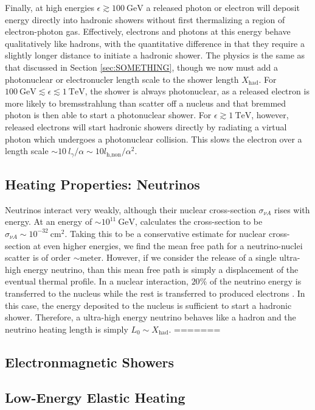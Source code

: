 \documentclass[twocolumn, preprintnumbers,amsmath,amssymb,prd, superscriptaddress]{revtex4}
\newcommand{\TeV}{\text{TeV}}
\newcommand{\GeV}{\text{GeV}}
\newcommand{\cm}{\text{cm}}
\begin{document}
Finally, at high energies $\epsilon \gtrsim 100~\GeV$ a released photon or electron will deposit energy directly into hadronic showers without first thermalizing a region of electron-photon gas.
Effectively, electrons and photons at this energy behave qualitatively like hadrons, with the quantitative difference in that they require a slightly longer distance to initiate a hadronic shower.
The physics is the same as that discussed in Section \ref{sec:SOMETHING}, though we now must add a photonuclear or electronucler length scale to the shower length $X_\text{had}$.
For $100~\GeV \lesssim \epsilon \lesssim 1~\TeV$, the shower is always photonuclear, as a released electron is more likely to bremsstrahlung than scatter off a nucleus and that bremmed photon is then able to start a photonuclear shower.
For $\epsilon \gtrsim 1~\TeV$, however, released electrons will start hadronic showers directly by radiating a virtual photon which undergoes a photonuclear collision.
This slows the electron over a length scale $\sim 10~l_\gamma/\alpha \sim 10 l_\text{h,non}/\alpha^2 $.

\subsection{Heating Properties: Neutrinos}

Neutrinos interact very weakly, although their nuclear cross-section $\sigma_{\nu A}$ rises with energy.
At an energy of $\sim 10^{11} ~\GeV$, \cite{Formaggio:2013kya} calculates the cross-section to be $\sigma_{\nu A} \sim 10^{-32} ~\cm^2$.
Taking this to be a conservative estimate for nuclear cross-section at even higher energies, we find the mean free path for a neutrino-nuclei scatter is of order $\sim \text{meter}$.
However, if we consider the release of a single ultra-high energy neutrino, than this mean free path is simply a displacement of the eventual thermal profile.
In a nuclear interaction, $20 \%$ of the neutrino energy is transferred to the nucleus while the rest is transferred to produced electrons \cite{Formaggio:2013kya}.
In this case, the energy deposited to the nucleus is sufficient to start a hadronic shower.
Therefore, a ultra-high energy neutrino behaves like a hadron and the neutrino heating length is simply $L_0 \sim X_\text{had}$.
=======
\subsection{Electronmagnetic Showers}


\subsection{Low-Energy Elastic Heating}
\end{document}
